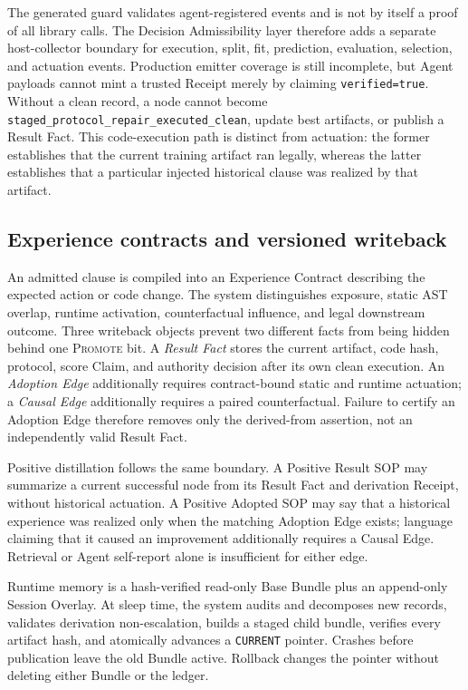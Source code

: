 \documentclass{article}
\begin{document}
The generated guard validates agent-registered events and is not by itself a
proof of all library calls.  The Decision Admissibility layer therefore adds a
separate host-collector boundary for execution, split, fit, prediction,
evaluation, selection, and actuation events.  Production emitter coverage is
still incomplete, but Agent payloads cannot mint a trusted Receipt merely by
claiming \texttt{verified=true}.  Without a clean record, a node cannot become
\texttt{staged\_protocol\_repair\_executed\_clean}, update best artifacts, or
publish a Result Fact.  This code-execution path is distinct from actuation:
the former establishes that the current training artifact ran legally, whereas
the latter establishes that a particular injected historical clause was
realized by that artifact.

\subsection{Experience contracts and versioned writeback}

An admitted clause is compiled into an Experience Contract describing the
expected action or code change.  The system distinguishes exposure, static AST
overlap, runtime activation, counterfactual influence, and legal downstream
outcome.  Three writeback objects prevent two different facts from being hidden
behind one \textsc{Promote} bit.  A \emph{Result Fact} stores the current
artifact, code hash, protocol, score Claim, and authority decision after its own
clean execution.  An \emph{Adoption Edge} additionally requires contract-bound
static and runtime actuation; a \emph{Causal Edge} additionally requires a
paired counterfactual.  Failure to certify an Adoption Edge therefore removes
only the derived-from assertion, not an independently valid Result Fact.

Positive distillation follows the same boundary.  A Positive Result SOP may
summarize a current successful node from its Result Fact and derivation Receipt,
without historical actuation.  A Positive Adopted SOP may say that a historical
experience was realized only when the matching Adoption Edge exists; language
claiming that it caused an improvement additionally requires a Causal Edge.
Retrieval or Agent self-report alone is insufficient for either edge.

Runtime memory is a hash-verified read-only Base Bundle plus an append-only
Session Overlay.  At sleep time, the system audits and decomposes new records,
validates derivation non-escalation, builds a staged child bundle, verifies every
artifact hash, and atomically advances a \texttt{CURRENT} pointer.  Crashes
before publication leave the old Bundle active.  Rollback changes the pointer
without deleting either Bundle or the ledger.
\end{document}
